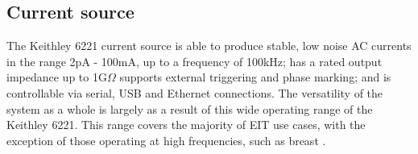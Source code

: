 \subsection{Current source}

The Keithley 6221 current source is able to produce stable, low noise AC currents in the range 2pA - 100mA, up to a frequency of 100kHz; has a rated output impedance up to 1G\(\Omega\) supports external triggering and phase marking; and is controllable via serial, USB and Ethernet connections. The versatility of the system as a whole is largely as a result of this wide operating range of the Keithley 6221. This range covers the majority of EIT use cases, with the exception of those operating at high frequencies, such as breast \cite{khan}. 